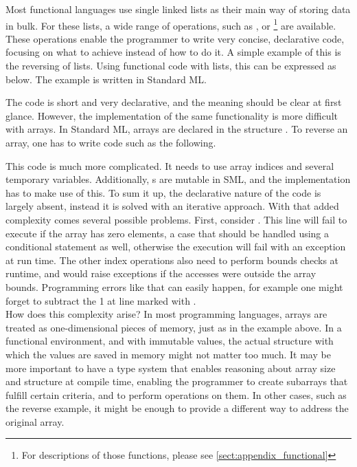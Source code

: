 Most functional languages use single linked lists as their main way of storing data in bulk. For these lists, a wide range of operations, such as ,  or \footnote{For descriptions of those functions, please see \ref{sect:appendix_functional}} are available. These operations enable the programmer to write very concise, declarative code, focusing on what to achieve instead of how to do it. A simple example of this is the reversing of lists. Using functional code with lists, this can be expressed as below. The example is written in Standard ML.



The code is short and very declarative, and the meaning should be clear at first glance. However, the implementation of the same functionality is more difficult with arrays. In Standard ML, arrays are declared in the structure . To reverse an array, one has to write code such as the following.



This code is much more complicated. It needs to use array indices and several temporary variables. Additionally, s are mutable in SML, and the implementation has to make use of this. To sum it up, the declarative nature of the code is largely absent, instead it is solved with an iterative approach. With that added complexity comes several possible problems. First, consider . This line will fail to execute if the array has zero elements, a case that should be handled using a conditional statement as well, otherwise the execution will fail with an exception at run time. The other index operations also need to perform bounds checks at runtime, and would raise exceptions if the accesses were outside the array bounds. Programming errors like that can easily happen, for example one might forget to subtract the 1 at line marked with .\\

How does this complexity arise? In most programming languages, arrays are treated as one-dimensional pieces of memory, just as in the example above. In a functional environment, and with immutable values, the actual structure with which the values are saved in memory might not matter too much. It may be more important to have a type system that enables reasoning about array size and structure at compile time, enabling the programmer to create subarrays that fulfill certain criteria, and to perform operations on them. In other cases, such as the reverse example, it might be enough to provide a different way to address the original array. \\

